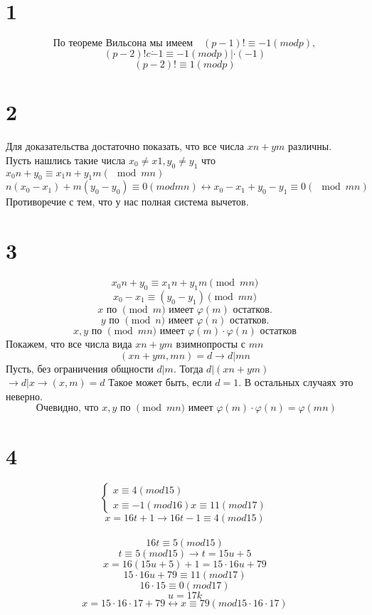 

	\section*{1}
	$$\text{По теореме Вильсона мы имеем} \quad (p-1)! \equiv -1 (mod p), $$
	$$(p-2)! c\dot -1 \equiv -1 (mod p) | \cdot(-1)$$
	$$(p-2)! \equiv 1 (mod p)$$
	\section*{2}
	Для доказательства достаточно показать, что все числа $xn+ym$ различны. \\
	Пусть нашлись такие числа $x_0\ne x1, y_0\ne y_1 $ что $x_0n + y_0 \equiv x_1n + y_1m(\mod mn)$
	$$n(x_0-x_1) + m(y_0-y_0) \equiv 0(mod mn) \leftrightarrow x_0 -x_1 + y_0 -y_1 \equiv 0 (\mod mn)$$
	Противоречие с тем, что у нас полная система вычетов. 
	\section*{3}
	$$x_0n + y_0 \equiv x_1n + y_1m\pmod {mn}$$
		$$x_0-x_1 \equiv (y_0-y_1)\pmod {mn}$$
$$x \text{ по } \pmod m \text{ имеет $\varphi(m)$ остатков.} $$
$$y \text{ по } \pmod n\text{ имеет $\varphi(n)$ остатков.} $$
$$x,y \text{ по } \pmod {mn} \text{ имеет } \varphi(m)\cdot \varphi(n) \text{ остатков}$$
Покажем, что все числа вида $xn + ym $ взимнопросты с $mn$ \\
$$(xn +ym, mn) = d \to d|mn $$
Пусть, без ограничения общности $d|m$. Тогда $d|(xn+ym)$
$\to d|x \to (x,m) = d$ Такое может быть, если $d =1$. В остальных случаях это неверно. \\
$$\text{ Очевидно, что }x,y \text{ по } \pmod {mn} \text{ имеет } \varphi(m)\cdot \varphi(n)  = \varphi(mn)$$
	\section*{4}
	$$\begin{cases}
		x \equiv 4(mod 15)\\
		x \equiv -1 (mod 16)
		x \equiv 11 (mod 17)
	\end{cases}$$
	$$x = 16t + 1 \to 16t-1 \equiv 4(mod 15)$$ \\
	$$16t \equiv 5(mod 15)$$
	$$t \equiv 5(mod 15) \to t = 15u+ 5$$
	$$x = 16(15u+5) + 1 = 15\cdot16 u + 79$$
	$$ 15\cdot16 u + 79 \equiv 11(mod 17)$$
	$$16\cdot 15 \equiv 0 (mod 17)$$
	$$u  = 17k$$
	$$x = 15\cdot16\cdot17 + 79 \leftrightarrow x\equiv 79(mod 15\cdot 16\cdot 17)$$
